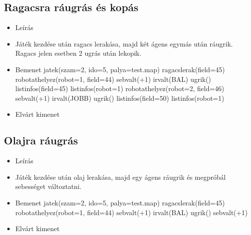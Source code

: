 \subsection{Ragacsra ráugrás és kopás}
\begin{itemize}
	\item Leírás\newline
	\item Játék kezdése után ragacs lerakása, majd két ágens egymás után ráugrik. Ragacs jelen esetben 2 ugrás után lekopik.
	\item Bemenet\newline
		jatek(szam=2, ido=5, palya=test.map) \newline
		ragacslerak(field=45) \newline
		robotathelyez(robot=1, field=44) \newline
		sebvalt(+1) \newline
		irvalt(BAL) \newline
		ugrik() \newline
		listinfos(field=45) \newline
		listinfos(robot=1) \newline
		robotathelyez(robot=2, field=46) \newline
		sebvalt(+1) \newline
		irvalt(JOBB) \newline
		ugrik() \newline
		listinfos(field=50) \newline		
		listinfos(robot=1) \newline		
	\item Elvárt kimenet\newline
\end{itemize}

\subsection{Olajra ráugrás}
\begin{itemize}
	\item Leírás\newline
	\item Játék kezdése után olaj lerakása, majd egy ágens ráugrik és megpróbál sebességet változtatni. 
	\item Bemenet\newline	
		jatek(szam=2, ido=5, palya=test.map) \newline
		ragacslerak(field=45) \newline
		robotathelyez(robot=1, field=44) \newline
		sebvalt(+1) \newline
		irvalt(BAL) \newline
		ugrik() \newline
		sebvalt(+1)	\newline
	\item Elvárt kimenet\newline
\end{itemize}

